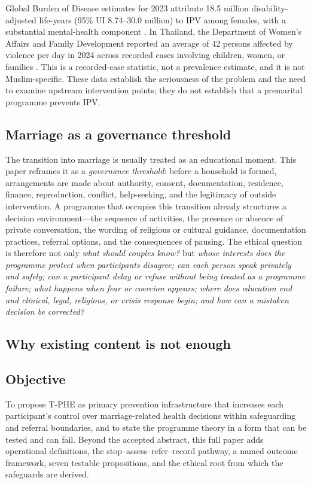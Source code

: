 \documentclass[10pt,twocolumn]{article}
\newcommand{\tphe}{T\mbox{-}PHE}
\begin{document}
Global Burden of Disease estimates for 2023 attribute 18.5 million disability-adjusted life-years (95\% UI 8.74--30.0 million) to IPV among females, with a substantial mental-health component \cite{ref1}. In Thailand, the Department of Women's Affairs and Family Development reported an average of 42 persons affected by violence per day in 2024 across recorded cases involving children, women, or families \cite{dwf2024}. This is a recorded-case statistic, not a prevalence estimate, and it is not Muslim-specific. These data establish the seriousness of the problem and the need to examine upstream intervention points; they do not establish that a premarital programme prevents IPV.

\subsection{Marriage as a governance threshold}
The transition into marriage is usually treated as an educational moment. This paper reframes it as a \emph{governance threshold}: before a household is formed, arrangements are made about authority, consent, documentation, residence, finance, reproduction, conflict, help-seeking, and the legitimacy of outside intervention. A programme that occupies this transition already structures a decision environment---the sequence of activities, the presence or absence of private conversation, the wording of religious or cultural guidance, documentation practices, referral options, and the consequences of pausing. The ethical question is therefore not only \emph{what should couples know?} but \emph{whose interests does the programme protect when participants disagree; can each person speak privately and safely; can a participant delay or refuse without being treated as a programme failure; what happens when fear or coercion appears; where does education end and clinical, legal, religious, or crisis response begin; and how can a mistaken decision be corrected?}

\subsection{Why existing content is not enough}


\subsection{Objective}
To propose \tphe{} as primary prevention infrastructure that increases each participant's control over marriage-related health decisions within safeguarding and referral boundaries, and to state the programme theory in a form that can be tested and can fail. Beyond the accepted abstract, this full paper adds operational definitions, the stop--assess--refer--record pathway, a named outcome framework, seven testable propositions, and the ethical root from which the safeguards are derived.
\end{document}
